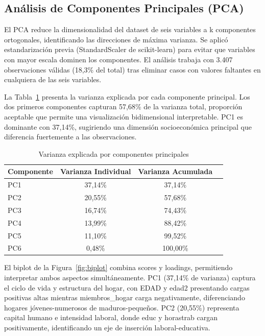 \documentclass[11pt,a4paper]{article}
\begin{document}
\subsection{Análisis de Componentes Principales (PCA)}

El PCA reduce la dimensionalidad del dataset de seis variables a k componentes ortogonales, identificando las direcciones de máxima varianza. Se aplicó estandarización previa (StandardScaler de scikit-learn) para evitar que variables con mayor escala dominen los componentes. El análisis trabaja con 3.407 observaciones válidas (18,3\% del total) tras eliminar casos con valores faltantes en cualquiera de las seis variables.

La Tabla~\ref{tab:pcavarianza} presenta la varianza explicada por cada componente principal. Los dos primeros componentes capturan 57,68\% de la varianza total, proporción aceptable que permite una visualización bidimensional interpretable. PC1 es dominante con 37,14\%, sugiriendo una dimensión socioeconómica principal que diferencia fuertemente a las observaciones.

\begin{table}[H]
    \centering
    \begin{tabular}{lccc}
        \toprule
        \textbf{Componente} & \textbf{Varianza Individual} & \textbf{Varianza Acumulada} \\
        \midrule
        PC1                 & 37,14\%                      & 37,14\%                     \\
        PC2                 & 20,55\%                      & 57,68\%                     \\
        PC3                 & 16,74\%                      & 74,43\%                     \\
        PC4                 & 13,99\%                      & 88,42\%                     \\
        PC5                 & 11,10\%                      & 99,52\%                     \\
        PC6                 & 0,48\%                       & 100,00\%                    \\
        \bottomrule
    \end{tabular}
    \caption{Varianza explicada por componentes principales}
    \label{tab:pcavarianza}
\end{table}

El biplot de la Figura~\ref{fig:biplot} combina scores y loadings, permitiendo interpretar ambos aspectos simultáneamente. PC1 (37,14\% de varianza) captura el ciclo de vida y estructura del hogar, con EDAD y edad2 presentando cargas positivas altas mientras miembros\_hogar carga negativamente, diferenciando hogares jóvenes-numerosos de maduros-pequeños. PC2 (20,55\%) representa capital humano e intensidad laboral, donde educ y horastrab cargan positivamente, identificando un eje de inserción laboral-educativa.
\end{document}
